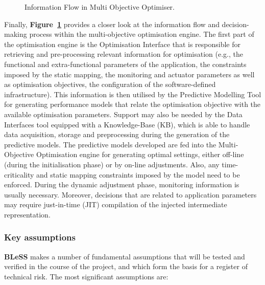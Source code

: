 \documentclass[a4paper,11pt]{article}
\newcommand{\project}[1]{\textbf{#1}\xspace}
\newcommand{\BLESS}{\project{BLeSS}}
\newcommand{\TheProject}{\BLESS}
\begin{document}

 \begin{figure}[tp]
 \begin{center}
 \vspace*{5mm}
 \hspace{0in}
 \end{center}
  \vspace{0cm}
 \caption{Information Flow in Multi Objective Optimiser.}
 \label{fig:MOO_flow}
 \end{figure}


Finally, \textbf{Figure~\ref{fig:MOO_flow}} provides a closer look at the
information flow and decision-making process within the multi-objective
optimisation engine. The first part of the optimisation engine is the
Optimisation Interface that is responsible for retrieving and
pre-processing relevant information for optimisation (e.g., the functional
and extra-functional parameters of the application, the constraints imposed
by the static mapping, the monitoring and actuator parameters as well as
optimisation objectives, the configuration of the software-defined infrastructure). This information is then
utilised by the Predictive Modelling Tool for generating performance
models that relate the optimisation objective with the available
optimisation parameters. Support may also be needed by the Data
Interfaces tool equipped with a Knowledge-Base (KB), which is able to
handle data acquisition, storage and preprocessing during the generation
of the predictive models. The predictive models developed are fed into
the Multi-Objective Optimisation engine for generating optimal settings,
either off-line (during the initialisation phase) or by on-line
adjustments. Also, any time-criticality and static mapping constraints
imposed by the model need to be enforced. During the dynamic adjustment
phase, monitoring information is usually necessary. Moreover, decisions
that are related to application parameters may require just-in-time (JIT)
compilation of the injected intermediate representation.

\pagebreak
\subsubsection*{Key assumptions}


\TheProject{} makes a number of fundamental assumptions that will be tested and verified in the course of the project,
and which form the basis for a register of technical risk.  The most significant assumptions are:
\end{document}
